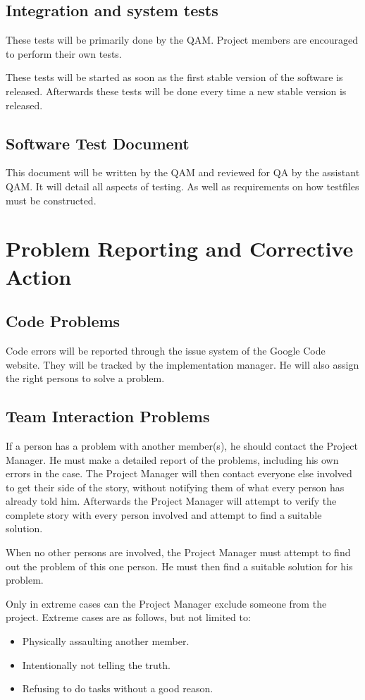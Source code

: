 \documentclass[salesmen, twoside]{softproj}
\begin{document}
\begin{projdoc}
\section{Integration and system tests}
These tests will be primarily done by the QAM. Project members are encouraged to perform their own tests.

These tests will be started as soon as the first stable version of the software is released. Afterwards these tests will be done every time a new stable version is released.

\section{Software Test Document}
This document will be written by the QAM and reviewed for QA by the assistant QAM. It will detail all aspects of testing. As well as requirements on how testfiles must be constructed.


\chapter{Problem Reporting and Corrective Action}
\section{Code Problems}
Code errors will be reported through the issue system of the Google Code website. They will be tracked by the implementation manager. He will also assign the right persons to solve a problem.

\section{Team Interaction Problems}
If a person has a problem with another member(s), he should contact the Project Manager. He must make a detailed report of the problems, including his own errors in the case. The Project Manager will then contact everyone else involved to get their side of the story, without notifying them of what every person has already told him. Afterwards the Project Manager will attempt to verify the complete story with every person involved and attempt to find a suitable solution.

When no other persons are involved, the Project Manager must attempt to find out the problem of this one person. He must then find a suitable solution for his problem.

Only in extreme cases can the Project Manager exclude someone from the project. Extreme cases are as follows, but not limited to:
\begin{itemize}
\item
Physically assaulting another member.
\item
Intentionally not telling the truth.
\item
Refusing to do tasks without a good reason.
\end{itemize}


\end{projdoc}
\end{document}
